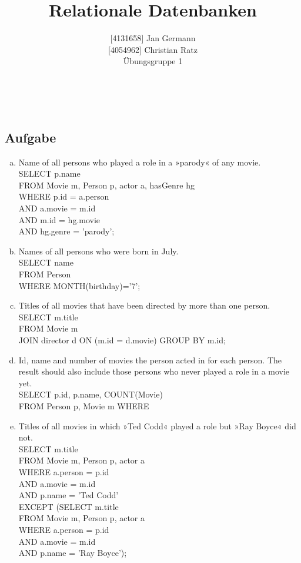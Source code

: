 \documentclass[11pt,a4paper,DIV=9]{scrartcl}
\author{{[}4131658{]} Jan Germann \\{[}4054962{]} Christian Ratz\\Übungsgruppe 1}
\title{Relationale Datenbanken}
\newcounter{temp}
\newcommand{\aufgabe}[1]{
  \setcounter{temp}{\value{subsection}}
  \setcounter{subsection}{#1}
  \addtocounter{subsection}{-1}
  \subsection{Aufgabe}
  \setcounter{subsection}{\value{temp}}
}
\renewcommand{\author}[1]{\renewcommand{\author}{#1}}
\renewcommand{\title}[1]{\renewcommand{\title}{#1}}
\newcommand{\makehomeworktitle}{
  \begin{minipage}[t]{6.5cm}
    \sf{\author}
  \end{minipage}
  \begin{minipage}[t]{6.5cm}
    \begin{flushright}
      \sf{\title\\\today}
    \end{flushright}
  \end{minipage}
  \\[0.2cm]
  \begin{center}
    \sf{
      \color{blue}{
        \LARGE{Aufgabenblatt \blattnr}
      }
    }
  \end{center}
  \vspace{0.1cm}
}
\begin{document}
\makehomeworktitle
\aufgabe{1}
  \begin{enumerate}[a.]
      \item Name of all persons who played a role in a »parody« of any movie.\hfill\\
      SELECT p.name \\
      FROM Movie m, Person p, actor a, hasGenre hg \\
      WHERE p.id = a.person \\
      AND a.movie = m.id \\
      AND m.id = hg.movie \\
      AND hg.genre = 'parody';

      \item Names of all persons who were born in July.\hfill\\
      SELECT name \\
      FROM Person \\
      WHERE MONTH(birthday)='7';
      	
      \item Titles of all movies that have been directed by more than one person.\hfill\\ %
      SELECT m.title \\
      FROM Movie m \\
      JOIN director d
      ON (m.id = d.movie)
      GROUP BY m.id;

      \item Id, name and number of movies the person acted in for each person. The result should also include those persons who never played a role in a movie yet.\hfill\\ %
      SELECT p.id, p.name, COUNT(Movie) \\
      FROM Person p, Movie m
      WHERE

      \item Titles of all movies in which »Ted Codd« played a role but »Ray Boyce« did not.\hfill\\
      SELECT m.title \\
      FROM Movie m, Person p, actor a \\ 
      WHERE a.person = p.id \\
      AND a.movie = m.id \\
      AND p.name = 'Ted Codd' \\
      EXCEPT (SELECT m.title \\
      FROM Movie m, Person p, actor a \\
      WHERE a.person = p.id \\
      AND a.movie = m.id \\
      AND p.name = 'Ray Boyce');


\end{enumerate}
\end{document}
